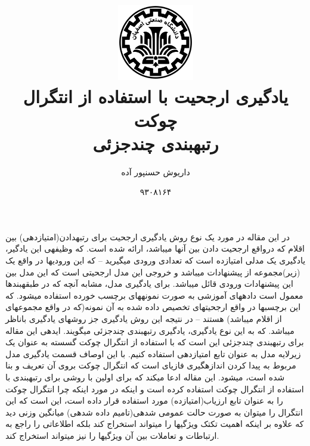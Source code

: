 \documentclass[10pt,a4paper]{article}
\newcommand{\نیمفاصله}{\halfspace}
\renewcommand{\ }{\halfspace}
\begin{document}
\title{
    \includegraphics[width=0.25\textwidth]{iut}\\\vspace{30pt}
یادگیری ارجحیت با استفاده از انتگرال چوکت    
\\رتبه\ بندی چندجزئی    
}
\author{داریوش حسن\ پور آده}
\date{۹۳۰۸۱۶۴}
\maketitle
\null
\vfill
\thispagestyle{empty}
\setcounter{page}{0}
\newpage
در این مقاله\
\cite{THEPAPER}
در مورد یک نوع روش یادگیری ارجحیت برای رتبه\ دادن(امتیازدهی) بین اقلام که درواقع ارجحیت دادن بین آنها می\ باشد، ارائه شده است. که وظیفه\ ی این یادگیر، یادگیری یک مدلی امتیازده است که تعدادی ورودی می\ گیرید -- که این ورودی\ ها در واقع یک (زیر)مجموعه از پیشنهادات می\ باشد و خروجی این مدل ارجحیتی است که این مدل بین این پیشنهادات ورودی قائل می\ باشد. برای یادگیری مدل، مشابه آنچه که در طبقه\ بندها معمول است داده\ های آموزشی به صورت نمونه\ های برچسب خورده استفاده می\ شود. که این برچسب\ ها در واقع ارجحیت\ های تخصیص داده شده به آن نمونه(که در واقع مجموعه\ ای از اقلام می\ باشد) هستند -- در نتیجه این روش یادگیری جز روش\ های یادگیری باناظر می\ باشد. که به این نوع یادگیری، یادگیری رتبه\ بندی چندجزئی\زیرنویس{\lr{Multipartitle
Ranking}} می\ گویند.\بند
ایده\ ی این مقاله برای رتبه\ بندی چندجزئی این است که با استفاده از انتگرال چوکت گسسته به عنوان یک زیرلایه مدل به عنوان تابع امتیازدهی استفاده کنیم. با این اوصاف قسمت یادگیری مدل مربوط به پیدا کردن اندازه\ گیری فازیای است که انتگرال چوکت بروی‌ آن تعریف و بنا شده است، می\ شود.
این مقاله ادعا می\ کند که برای اولین با روشی برای رتبه\ بندی با استفاده از انتگرال چوکت استفاده کرده است و اینکه در مورد اینکه چرا انتگرال چوکت را به عنوان تابع ارزیاب(امتیازده) مورد استفاده قرار داده است، این است که این انتگرال را می\ توان به صورت حالت عمومی شده\ ی(تامیم داده شده\ ی) میانگین وزنی دید که علاوه بر اینکه اهمیت تک\ تک ویژگیها را می\ تواند استخراج کند بلکه اطلاعاتی را راجع به ارتباطات و تعاملات بین آن ویژگی\ ها را نیز می\ تواند استخراج کند.
\end{document}
